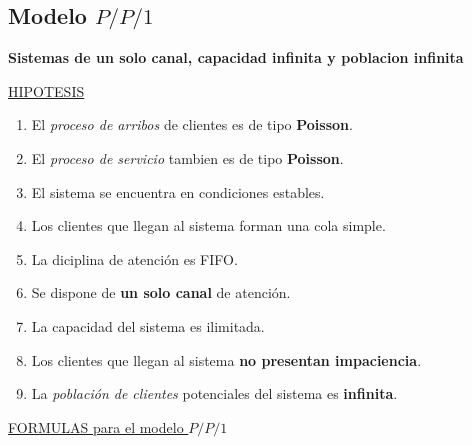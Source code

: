 \documentclass{article}
\begin{document}
\subsection{Modelo \(P/P/1\)}
\textbf{Sistemas de un solo canal, capacidad infinita y poblacion infinita}

\noindent
\underline{HIPOTESIS}
\begin{enumerate}
    \item El \textit{proceso de arribos} de clientes es de tipo \textbf{Poisson}.
    \item El \textit{proceso de servicio} tambien es de tipo \textbf{Poisson}.
    \item El sistema se encuentra en condiciones estables.
    \item Los clientes que llegan al sistema forman una cola simple.
    \item La diciplina de atención es FIFO.
    \item Se dispone de \textbf{un solo canal} de atención.
    \item La capacidad del sistema es ilimitada.
    \item Los clientes que llegan al sistema \textbf{no presentan impaciencia}.
    \item La \textit{población de clientes} potenciales del sistema es \textbf{infinita}.
\end{enumerate}



\noindent
\underline{FORMULAS para el modelo \(P/P/1\)}
\end{document}
